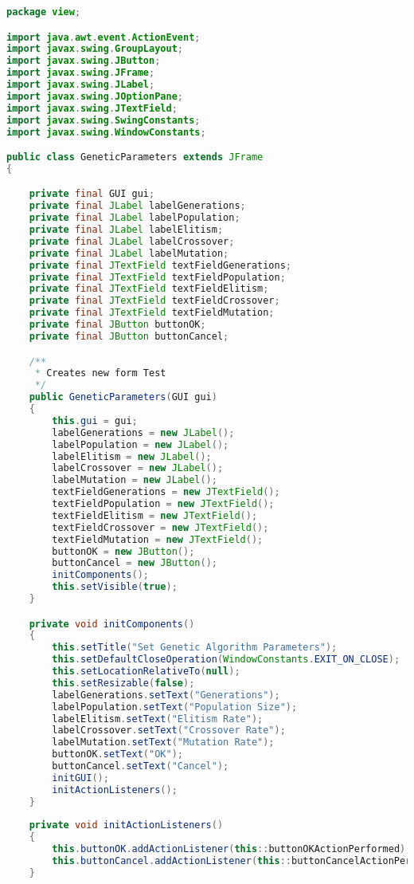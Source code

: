 \begin{lstlisting}[language=Java,basicstyle=\tiny,caption=GeneticParameters.java]
package view;

import java.awt.event.ActionEvent;
import javax.swing.GroupLayout;
import javax.swing.JButton;
import javax.swing.JFrame;
import javax.swing.JLabel;
import javax.swing.JOptionPane;
import javax.swing.JTextField;
import javax.swing.SwingConstants;
import javax.swing.WindowConstants;

public class GeneticParameters extends JFrame
{

    private final GUI gui;
    private final JLabel labelGenerations;
    private final JLabel labelPopulation;
    private final JLabel labelElitism;
    private final JLabel labelCrossover;
    private final JLabel labelMutation;
    private final JTextField textFieldGenerations;
    private final JTextField textFieldPopulation;
    private final JTextField textFieldElitism;
    private final JTextField textFieldCrossover;
    private final JTextField textFieldMutation;
    private final JButton buttonOK;
    private final JButton buttonCancel;

    /**
     * Creates new form Test
     */
    public GeneticParameters(GUI gui)
    {
        this.gui = gui;
        labelGenerations = new JLabel();
        labelPopulation = new JLabel();
        labelElitism = new JLabel();
        labelCrossover = new JLabel();
        labelMutation = new JLabel();
        textFieldGenerations = new JTextField();
        textFieldPopulation = new JTextField();
        textFieldElitism = new JTextField();
        textFieldCrossover = new JTextField();
        textFieldMutation = new JTextField();
        buttonOK = new JButton();
        buttonCancel = new JButton();
        initComponents();
        this.setVisible(true);
    }

    private void initComponents()
    {
        this.setTitle("Set Genetic Algorithm Parameters");
        this.setDefaultCloseOperation(WindowConstants.EXIT_ON_CLOSE);
        this.setLocationRelativeTo(null);
        this.setResizable(false);
        labelGenerations.setText("Generations");
        labelPopulation.setText("Population Size");
        labelElitism.setText("Elitism Rate");
        labelCrossover.setText("Crossover Rate");
        labelMutation.setText("Mutation Rate");
        buttonOK.setText("OK");
        buttonCancel.setText("Cancel");
        initGUI();
        initActionListeners();
    }
    
    private void initActionListeners()
    {   
        this.buttonOK.addActionListener(this::buttonOKActionPerformed);
        this.buttonCancel.addActionListener(this::buttonCancelActionPerformed);
    }


\end{lstlisting}
